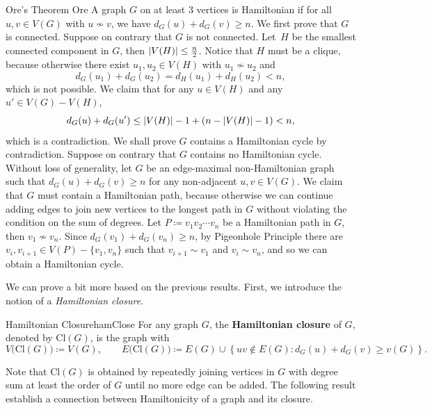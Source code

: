 \documentclass[math]{amznotes}
\theoremstyle{remark}
\begin{document}
\begin{thmbox}{Ore's Theorem} {Ore}
    A graph $G$ on at least $3$ vertices is Hamiltonian if for all $u, v \in V(G)$ with $u \not\sim v$, we have $d_G(u) + d_G(v) \geq n$.
    \tcblower
    We first prove that $G$ is connected. Suppose on contrary that $G$ is not connected. Let~$H$ be the smallest connected component in $G$, then ${\left\lvert {V(H)} \right\rvert} \leq \frac{n}{2}$. Notice that $H$ must be a clique, because otherwise there exist $u_1, u_2 \in V(H)$ with $u_1 \not\sim u_2$ and
    \begin{equation*}
        d_G(u_1) + d_G(u_2) = d_H(u_1) + d_H(u_2) < n,
    \end{equation*}
    which is not possible. We claim that for any $u \in V(H)$ and any $u' \in V(G) - V(H)$, 
    \begin{equation*}
        d_G(u) + d_G(u') \leq {\left\lvert {V(H)} \right\rvert} - 1 + \left(n - {\left\lvert {V(H)} \right\rvert} - 1\right) < n,
    \end{equation*}
    which is a contradiction. We shall prove $G$ contains a Hamiltonian cycle by contradiction. Suppose on contrary that $G$ contains no Hamiltonian cycle. Without loss of generality, let $G$ be an edge-maximal non-Hamiltonian graph such that $d_G(u) + d_G(v) \geq n$ for any non-adjacent $u, v \in V(G)$. We claim that $G$ must contain a Hamiltonian path, because otherwise we can continue adding edges to join new vertices to the longest path in $G$ without violating the condition on the sum of degrees. Let $P \coloneqq v_1v_2\cdots v_n$ be a Hamiltonian path in $G$, then $v_1 \not\sim v_n$. Since $d_G(v_1) + d_G(v_n) \geq n$, by Pigeonhole Principle there are $v_i, v_{i + 1} \in V(P) - \{v_1, v_n\}$ such that $v_{i + 1} \sim v_1$ and $v_i \sim v_n$, and so we can obtain a Hamiltonian cycle.
\end{thmbox}
We can prove a bit more based on the previous results. First, we introduce the notion of a \textit{Hamiltonian closure}.
\begin{dfnbox}{Hamiltonian Closure}{hamClose}
    For any graph $G$, the {\color{red} \textbf{Hamiltonian closure}} of $G$, denoted by $\mathrm{Cl}(G)$, is the graph with
    \begin{equation*}
        V\bigl(\mathrm{Cl}(G)\bigr) \coloneqq V(G), \qquad E\bigl(\mathrm{Cl}(G)\bigr) \coloneqq E(G) \cup \left\{uv \notin E(G) \colon d_G(u) + d_G(v) \geq v(G)\right\}.
    \end{equation*}
\end{dfnbox}
Note that $\mathrm{Cl}(G)$ is obtained by repeatedly joining vertices in $G$ with degree sum at least the order of $G$ until no more edge can be added. The following result establish a connection between Hamiltonicity of a graph and its closure.
\end{document}
